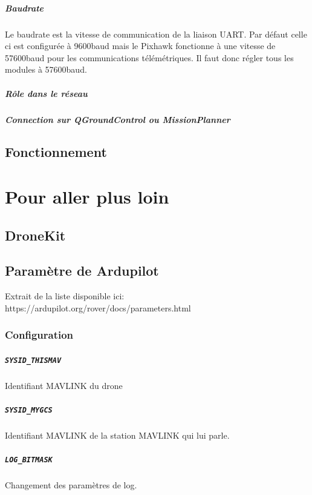 \documentclass[a4paper, 10pt]{report}
\begin{document}
\paragraph{Baudrate}
Le baudrate est la vitesse de communication de la liaison UART. Par défaut celle ci est configurée à 9600baud mais le Pixhawk fonctionne à une vitesse de 57600baud pour les communications télémétriques. Il faut donc régler tous les modules à 57600baud.
\paragraph{Rôle dans le réseau}

\paragraph{Connection sur QGroundControl ou MissionPlanner}


\section{Fonctionnement}
\chapter{Pour aller plus loin}
\section{DroneKit}
\section{Paramètre de Ardupilot}
	Extrait de la liste disponible ici: https://ardupilot.org/rover/docs/parameters.html
	\subsection{Configuration}
		\paragraph*{\texttt{SYSID\_THISMAV}}  Identifiant MAVLINK du drone
		\paragraph*{\texttt{SYSID\_MYGCS}}  Identifiant MAVLINK de la station MAVLINK qui lui parle.
		\paragraph*{\texttt{LOG\_BITMASK}} Changement des paramètres de log.
\end{document}

